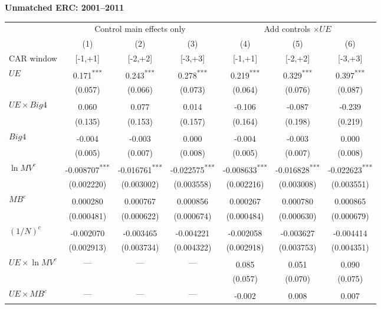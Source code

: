 \documentclass[10pt]{article}
\newcommand{\sym}[1]{\textsuperscript{#1}}
\begin{document}
\noindent\textbf{Unmatched ERC: 2001--2011}\par\medskip
\setlength{\tabcolsep}{4pt}\renewcommand{\arraystretch}{1.12}
\noindent\begin{tabular*}{\textwidth}{@{\extracolsep{\fill}}lcccccc@{}}\toprule
 & \multicolumn{3}{c}{Control main effects only} & \multicolumn{3}{c}{Add controls \(\times UE\)} \\
\cmidrule(lr){2-4}\cmidrule(lr){5-7}
 & (1) & (2) & (3) & (4) & (5) & (6) \\
CAR window & [-1,+1] & [-2,+2] & [-3,+3] & [-1,+1] & [-2,+2] & [-3,+3] \\\midrule
\(UE\) & 0.171\sym{***} & 0.243\sym{***} & 0.278\sym{***} & 0.219\sym{***} & 0.329\sym{***} & 0.397\sym{***} \\
 & (0.057) & (0.066) & (0.073) & (0.064) & (0.076) & (0.087) \\
\(UE\times Big4\) & 0.060\sym{} & 0.077\sym{} & 0.014\sym{} & -0.106\sym{} & -0.087\sym{} & -0.239\sym{} \\
 & (0.135) & (0.153) & (0.157) & (0.164) & (0.198) & (0.219) \\
\(Big4\) & -0.004\sym{} & -0.003\sym{} & 0.000\sym{} & -0.004\sym{} & -0.003\sym{} & 0.000\sym{} \\
 & (0.005) & (0.007) & (0.008) & (0.005) & (0.007) & (0.008) \\
\(\ln MV^c\) & -0.008707\sym{***} & -0.016761\sym{***} & -0.022575\sym{***} & -0.008633\sym{***} & -0.016828\sym{***} & -0.022623\sym{***} \\
 & (0.002220) & (0.003002) & (0.003558) & (0.002216) & (0.003008) & (0.003551) \\
\(MB^c\) & 0.000280\sym{} & 0.000767\sym{} & 0.000856\sym{} & 0.000267\sym{} & 0.000780\sym{} & 0.000865\sym{} \\
 & (0.000481) & (0.000622) & (0.000674) & (0.000484) & (0.000630) & (0.000679) \\
\((1/N)^c\) & -0.002070\sym{} & -0.003465\sym{} & -0.004221\sym{} & -0.002058\sym{} & -0.003627\sym{} & -0.004414\sym{} \\
 & (0.002913) & (0.003734) & (0.004322) & (0.002918) & (0.003753) & (0.004351) \\
\(UE\times\ln MV^c\) & --- & --- & --- & 0.085\sym{} & 0.051\sym{} & 0.090\sym{} \\
 &  &  &  & (0.057) & (0.070) & (0.075) \\
\(UE\times MB^c\) & --- & --- & --- & -0.002\sym{} & 0.008\sym{} & 0.007\sym{} \\

\end{tabular*}
\end{document}
